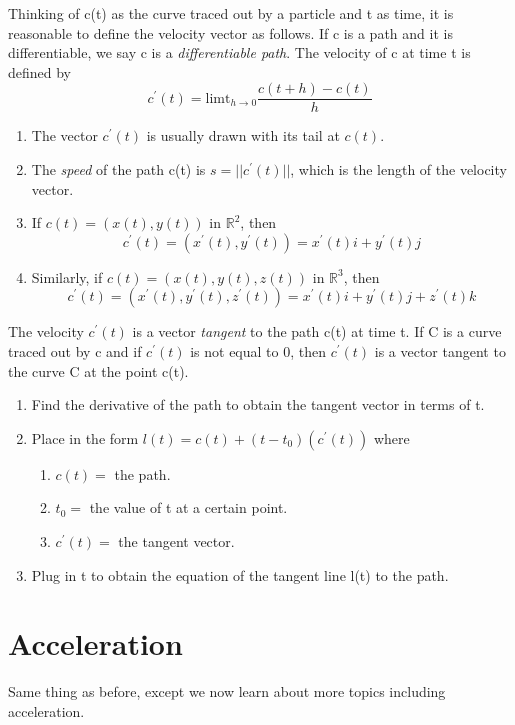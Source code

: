 \documentclass[12pt, letterpaper]{article}
\begin{document}
Thinking of c(t) as the curve traced out by a particle and t as time, it is reasonable to define the velocity vector as follows. If c is a path and it is differentiable, we say 
c is a \textit{differentiable path}. The velocity of c at time t is defined by 
\[
c^{'}(t) = \text{limt}_{h \rightarrow 0}\frac{c(t+h) - c(t)}{h}    
\]
\begin{enumerate}
    \item The vector \(c^{'}(t)\) is usually drawn with its tail at \(c(t)\).
    \item The \textit{speed} of the path c(t) is \(s = ||c^{'}(t)||\), which is the length of the velocity vector.
    \item If \(c(t) = (x(t), y(t))\) in \(\mathbb{R}^2\), then \[c^{'}(t) = (x^{'}(t), y^{'}(t)) = x^{'}(t)i + y^{'}(t)j\]
    \item Similarly, if \(c(t) = (x(t), y(t), z(t))\) in \(\mathbb{R}^3\), then \[c^{'}(t) = (x^{'}(t), y^{'}(t), z^{'}(t)) = x^{'}(t)i + y^{'}(t)j + z^{'}(t)k\]
\end{enumerate} 

The velocity \(c^{'}(t)\) is a vector \textit{tangent} to the path c(t) at time t. If C is a curve traced out by c and if \(c^{'}(t)\) is not equal to 0, then \(c^{'}(t)\) is a vector tangent to the curve C at the point c(t).
\begin{enumerate}
    \item Find the derivative of the path to obtain the tangent vector in terms of t. 
    \item Place in the form \(l(t) = c(t) + (t - t_0)(c^{'}(t))\) where 
    \begin{enumerate}
        \item \(c(t) = \) the path.
        \item \(t_0 = \) the value of t at a certain point.
        \item \(c^{'}(t) = \) the tangent vector.
    \end{enumerate}
    \item Plug in t to obtain the equation of the tangent line l(t) to the path.
\end{enumerate}

\section{Acceleration}

Same thing as before, except we now learn about more topics including acceleration.
\end{document}

